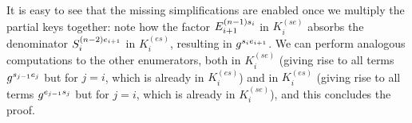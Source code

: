 It is easy to see that the missing simplifications are enabled once we multiply the partial keys together: note how the factor $E_{i+1}^{(n-1)s_i}$ in $K_i^{(se)}$ absorbs the denominator ${S_{i}^{(n-2)e_{i+1}}}$ in $K_i^{(es)}$, resulting in $g^{s_i e_{i+1}}$.
We can perform analogous computations to the other enumerators, both in $K_i^{(se)}$ (giving rise to all terms $g^{s_{j-1}e_j}$ but for $j=i$, which is already in $K_i^{(es)}$) and in $K_i^{(es)}$ (giving rise to all terms $g^{e_{j-1}s_j}$ but for $j=i$, which is already in $K_i^{(se)}$), and this concludes the proof.
